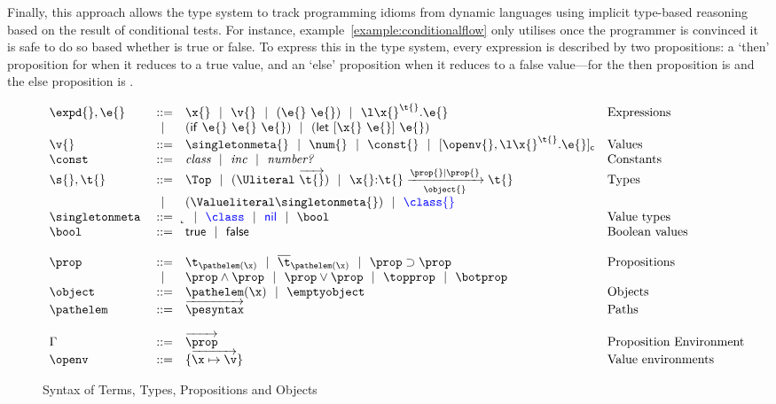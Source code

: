Finally, this approach allows the type system to track
programming idioms from 
dynamic languages
using implicit type-based reasoning based on the result of
conditional tests.
For instance, example~\ref{example:conditionalflow}
only utilises  once
the programmer is convinced it is safe to do so based whether
is 
true or false. 
To express this in the type system, every expression 
is described by two propositions: a `then' proposition
for when it reduces to a true value, and an `else' proposition
when it reduces to a false value---for 
the then proposition is {\isprop{\NumberFull}{\x{}}} and 
the else proposition is {\notprop{\NumberFull}{\x{}}}.

\begin{figure}
  \footnotesize
$$
\begin{array}{lrll}
  \expd{}, \e{} &::=& \x{}
                      \alt \v{} 
                      \alt {\comb {\e{}} {\e{}}} 
                      \alt {\abs {\x{}} {\t{}} {\e{}}} &\mbox{Expressions} \\
                      &\alt& {\ifexp {\e{}} {\e{}} {\e{}}}
                      \alt {\letexp {\x{}} {\e{}} {\e{}}}\\
  \v{} &::=&          \singletonmeta{}
                      \alt {\num{}}
                      \alt {\const{}}
                      \alt {\closure {\openv{}} {\abs {\x{}} {\t{}} {\e{}}}}
                &\mbox{Values} \\
                \constantssyntax{}\\
  \s{}, \t{}    &::=& \Top 
                      \alt {\Unionsplice {\overrightarrow{\t{}}}}
                      \alt
                      {\ArrowOne {\x{}} {\t{}}
                                   {\t{}}
                                   {\filterset {\prop{}} {\prop{}}}
                                   {\object{}}}
                &\mbox{Types} \\
                      &\alt& {\Value \singletonmeta{}} 
                      \alt \trdiff{\class{}}\\
  \singletonallsyntax{}
                \\ \\
  \occurrencetypingsyntax{}\\
  \propenvsyntax{}\\
  \openvsyntax{}
\end{array}
$$
\caption{Syntax of Terms, Types, Propositions and Objects}
\label{main:figure:termsyntax}
\end{figure}


